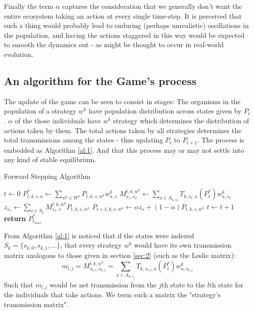 Finally the term $\alpha$ captures the consideration that we generally don't want the entire ecosystem taking an action at every single time-step. It is perceived that such a thing would probably lead to enduring (perhaps unrealistic) oscillations in the population, and having the actions staggered in this way would be expected to smooth the dynamics out - as might be thought to occur in real-world evolution.

\subsection{An algorithm for the Game's process}

The update of the game can be seen to consist in stages: The organisms in the population of a strategy $w^k$ have population distribution across states given by $P_t$.  $\alpha$ of the those individuals have $w^k$ strategy which determines the distribution of actions taken by them.  The total actions taken by all strategies determines the total transmissions among the states - thus updating $P_t$ to $P_{t+1}$. The process is embedded as Algorithm \ref{al:1}. And that this process may or may not settle into any kind of stable equilibrium.

\begin{algorithm}[h]
\caption{Forward Stepping Algorithm}\label{al:1}
\begin{algorithmic}[1]

\State $t\gets 0$
    \State $P^*_{t,k,s,a} \gets \sum_{w^k\in W^k}P_{t,k,s,w^k}w^k_{a,s}$
            \State $M^{t,k,w^k}_{s_1,s_2} \gets \sum_{a\in A_{k,s_2}}T_{k,s_1,a}(P^*_t) w^k_{a,s_2}$
            \State $z_{s_1} \gets \sum_{s\in S_k} M^{t,k,w^k}_{s_1,s}P_{t,k,s,w^k}$
            \State $P_{t+1,k,s,w^k} \gets \alpha z_s + (1-\alpha)P_{t,k,s,w^k}$
        \EndFor
    \EndFor
    \State $t\gets t+1$
\EndWhile
\State \textbf{return} $P^*_{t_{max}}$
\EndProcedure

\end{algorithmic}
\end{algorithm}
From Algorithm \ref{al:1} is noticed that if the states were indexed $S_k=\{s_{k,0},s_{k,1},\dots\}$, that every strategy $w^k$ would have its own transmission matrix analogous to those given in section \ref{sec:2} (such as the Leslie matrix):\begin{equation}\label{eq:transmission_matrix}m_{l,j} = M^{t,k,w^k}_{s_{k,l},s_{k,j}} = \sum_{a\in A_{k,s_j}}T_{k,s_{k,l},a}(P^*_t) w^k_{a,s_{k,j}}\end{equation}
Such that $m_{l,j}$ would be net transmission from the $j$th state to the $l$th state for the individuals that take actions. We term such a matrix the "strategy's transmission matrix".

